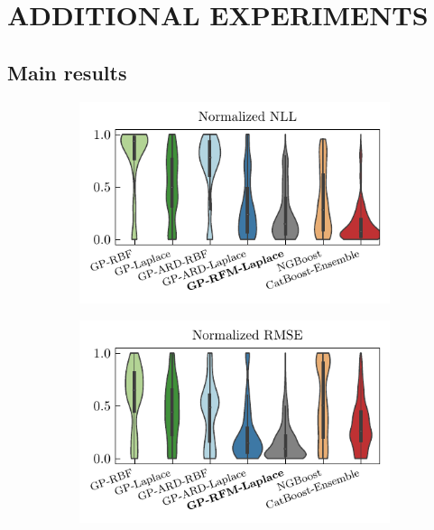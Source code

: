 \section{ADDITIONAL EXPERIMENTS}







\subsection{Main results}

\begin{figure}[htb]
    \centering
    \begin{subfigure}[b]{0.475\textwidth}
        \centering
        \includegraphics[trim=0 40 0 0, clip, width=\textwidth]{figures/tabularbenchmark_nll.pdf}
    \end{subfigure}
    \hfill
    \begin{subfigure}[b]{0.475\textwidth}  
        \centering 
        \includegraphics[trim=0 40 0 0, clip, width=\textwidth]{figures/tabularbenchmark_rmse.pdf}

\end{subfigure}
\end{figure}
